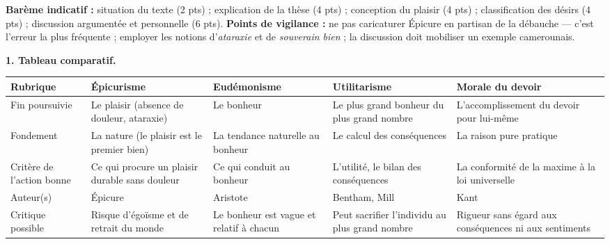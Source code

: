 \documentclass[11pt]{article}
\begin{document}
\begin{corrige}
\textbf{Barème indicatif :} situation du texte (2 pts) ; explication de la thèse (4 pts) ; conception du plaisir (4 pts) ; classification des désirs (4 pts) ; discussion argumentée et personnelle (6 pts).
\textbf{Points de vigilance :} ne pas caricaturer Épicure en partisan de la débauche — c'est l'erreur la plus fréquente ; employer les notions d'\emph{ataraxie} et de \emph{souverain bien} ; la discussion doit mobiliser un exemple camerounais.
\end{corrige}

\begin{corrige}
\textbf{1. Tableau comparatif.}
\begin{center}
\begin{tabularx}{\linewidth}{|l|X|X|X|X|}
\hline
\rowcolor{popblueL} \textbf{Rubrique} & \textbf{Épicurisme} & \textbf{Eudémonisme} & \textbf{Utilitarisme} & \textbf{Morale du devoir} \\
\hline
Fin poursuivie & Le plaisir (absence de douleur, ataraxie) & Le bonheur & Le plus grand bonheur du plus grand nombre & L'accomplissement du devoir pour lui-même \\
\hline
Fondement & La nature (le plaisir est le premier bien) & La tendance naturelle au bonheur & Le calcul des conséquences & La raison pure pratique \\
\hline
Critère de l'action bonne & Ce qui procure un plaisir durable sans douleur & Ce qui conduit au bonheur & L'utilité, le bilan des conséquences & La conformité de la maxime à la loi universelle \\
\hline
Auteur(s) & Épicure & Aristote & Bentham, Mill & Kant \\
\hline
Critique possible & Risque d'égoïsme et de retrait du monde & Le bonheur est vague et relatif à chacun & Peut sacrifier l'individu au plus grand nombre & Rigueur sans égard aux conséquences ni aux sentiments \\
\hline
\end{tabularx}
\end{center}


\end{corrige}
\end{document}
